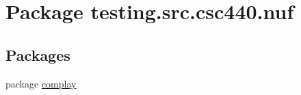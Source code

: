 \hypertarget{namespacetesting_1_1src_1_1csc440_1_1nuf}{\section{Package testing.\-src.\-csc440.\-nuf}
\label{namespacetesting_1_1src_1_1csc440_1_1nuf}
}
\subsection*{Packages}
\begin{DoxyCompactItemize}
\item 
package \hyperlink{namespacetesting_1_1src_1_1csc440_1_1nuf_1_1complay}{complay}
\end{DoxyCompactItemize}
